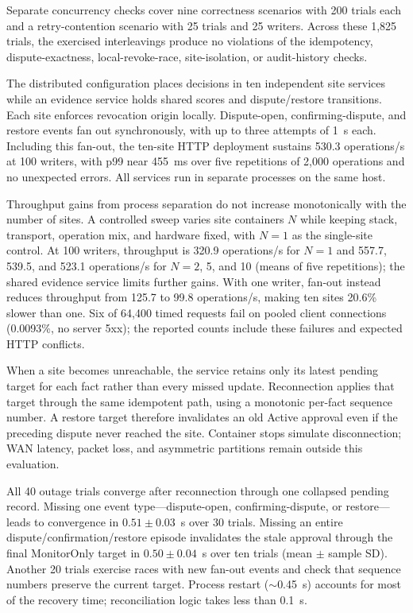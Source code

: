 \documentclass[journal]{IEEEtran}
\theoremstyle{definition}
\begin{document}
Separate concurrency checks cover nine correctness scenarios with 200 trials each and a retry-contention scenario with 25 trials and 25 writers. Across these 1,825 trials, the exercised interleavings produce no violations of the idempotency, dispute-exactness, local-revoke-race, site-isolation, or audit-history checks.

The distributed configuration places decisions in ten independent site services while an evidence service holds shared scores and dispute/restore transitions. Each site enforces revocation origin locally. Dispute-open, confirming-dispute, and restore events fan out synchronously, with up to three attempts of 1~s each. Including this fan-out, the ten-site HTTP deployment sustains 530.3 operations/s at 100 writers, with p99 near 455~ms over five repetitions of 2,000 operations and no unexpected errors. All services run in separate processes on the same host.


Throughput gains from process separation do not increase monotonically with the number of sites. A controlled sweep varies site containers $N$ while keeping stack, transport, operation mix, and hardware fixed, with $N=1$ as the single-site control. At 100 writers, throughput is 320.9 operations/s for $N=1$ and 557.7, 539.5, and 523.1 operations/s for $N=2$, 5, and 10 (means of five repetitions); the shared evidence service limits further gains. With one writer, fan-out instead reduces throughput from 125.7 to 99.8 operations/s, making ten sites 20.6\% slower than one. Six of 64,400 timed requests fail on pooled client connections (0.0093\%, no server 5xx); the reported counts include these failures and expected HTTP conflicts.

When a site becomes unreachable, the service retains only its latest pending target for each fact rather than every missed update. Reconnection applies that target through the same idempotent path, using a monotonic per-fact sequence number. A restore target therefore invalidates an old Active approval even if the preceding dispute never reached the site. Container stops simulate disconnection; WAN latency, packet loss, and asymmetric partitions remain outside this evaluation.

All 40 outage trials converge after reconnection through one collapsed pending record. Missing one event type---dispute-open, confirming-dispute, or restore---leads to convergence in $0.51\pm0.03$~s over 30 trials. Missing an entire dispute/confirmation/restore episode invalidates the stale approval through the final MonitorOnly target in $0.50\pm0.04$~s over ten trials (mean $\pm$ sample SD). Another 20 trials exercise races with new fan-out events and check that sequence numbers preserve the current target. Process restart ($\sim$0.45~s) accounts for most of the recovery time; reconciliation logic takes less than 0.1~s.
\end{document}
